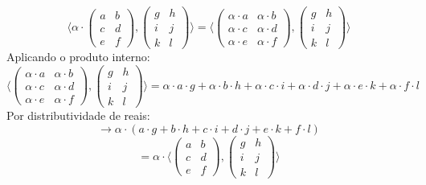 \documentclass[12pt, twoside, a4]{article} %
\begin{document}
\begin{enumerate}
    \[ \langle \alpha \cdot \begin{pmatrix} 
        a & b \\
        c & d \\
        e & f
       \end{pmatrix} ,\begin{pmatrix} 
        g & h \\
        i & j \\
        k & l
       \end{pmatrix} \rangle
        = \langle \begin{pmatrix} 
        \alpha \cdot a & \alpha \cdot b \\
        \alpha \cdot c & \alpha \cdot d \\
        \alpha \cdot e & \alpha \cdot f
        \end{pmatrix} ,\begin{pmatrix} 
        g & h \\
        i & j \\
        k & l
        \end{pmatrix} \rangle
        \]
        Aplicando o produto interno:
        \[ \langle \begin{pmatrix} 
        \alpha \cdot a & \alpha \cdot b \\
        \alpha \cdot c & \alpha \cdot d \\
        \alpha \cdot e & \alpha \cdot f
        \end{pmatrix} ,\begin{pmatrix} 
        g & h \\
        i & j \\
        k & l
        \end{pmatrix} \rangle
        = \alpha \cdot a \cdot  g + \alpha \cdot b \cdot h +
        \alpha \cdot c \cdot i + \alpha \cdot d \cdot j +
        \alpha \cdot e \cdot k + \alpha \cdot f  \cdot l  \]
        Por distributividade de reais:
        \[ \to  \alpha \cdot (a \cdot g + b \cdot h + c \cdot i + d \cdot j + e \cdot k + f \cdot l) \]
        \[ = \alpha \cdot \langle  \begin{pmatrix} 
            a & b \\
            c & d \\
            e & f
           \end{pmatrix} ,\begin{pmatrix} 
            g & h \\
            i & j \\
            k & l
           \end{pmatrix} \rangle \]

\end{enumerate}
\end{document}
